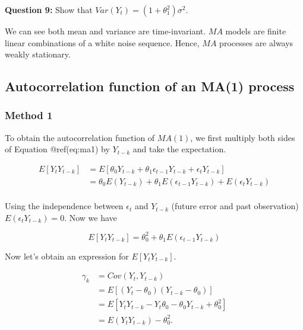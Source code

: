 \documentclass[
  11pt,
  a4paper,
]{report}
\begin{document}
\textbf{Question 9:} Show that \(Var(Y_t) = (1+\theta_1^2)\sigma^2\).

We can see both mean and variance are time-invariant. \(MA\) models are
finite linear combinations of a white noise sequence. Hence, \(MA\)
processes are always weakly stationary.

\subsection{Autocorrelation function of an MA(1)
process}\label{autocorrelation-function-of-an-ma1-process}

\subsubsection{Method 1}\label{method-1}

To obtain the autocorrelation function of \(MA(1)\), we first multiply
both sides of Equation @ref(eq:ma1) by \(Y_{t-k}\) and take the
expectation.

\begin{equation}
\label{eq: ma1acfs1}
\begin{aligned}
E[Y_tY_{t-k}] &= E[\theta_0 Y_{t-k} + \theta_1 \epsilon_{t-1} Y_{t-k} + \epsilon_t Y_{t-k}]\\
&= \theta_0 E(Y_{t-k}) + \theta_1 E(\epsilon_{t-1}Y_{t-k}) + E(\epsilon_t Y_{t-k})\\
\end{aligned}
\end{equation}

Using the independence between \(\epsilon_t\) and \(Y_{t-k}\) (future
error and past observation) \(E(\epsilon_t Y_{t-k}) = 0\). Now we have

\begin{equation}
\label{eq:ma1acfs2}
E[Y_tY_{t-k}] = \theta_0^2  + \theta_1 E(\epsilon_{t-1}Y_{t-k}) 
\end{equation}

Now let's obtain an expression for \(E[Y_t Y_{t-k}]\).

\begin{equation}
  \label{eq:covma1}
\begin{aligned}
  \gamma_k &= Cov(Y_t, Y_{t-k}) \\
         &= E[(Y_t-\theta_0)(Y_{t-k}-\theta_0)] \\
         &= E[Y_tY_{t-k}-Y_t\theta_0-\theta_0 Y_{t-k} +\theta_0^2] \\
         &= E(Y_t Y_{t-k}) - \theta_0^2. \\
\end{aligned}
\end{equation}
\end{document}
